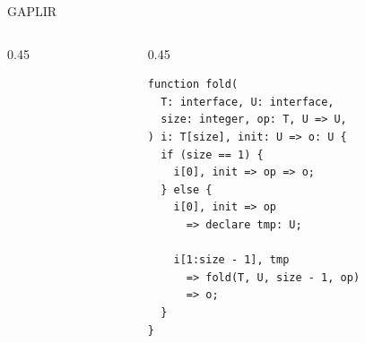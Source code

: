 \begin{frame}[fragile,t]{GAPLIR}
\begin{columns}[T]
\begin{column}{0.45\textwidth}
        \end{column}
        \begin{column}{0.45\textwidth}
\begin{lstlisting}[language=gapl]
function fold(
  T: interface, U: interface,
  size: integer, op: T, U => U,
) i: T[size], init: U => o: U {
  if (size == 1) {
    i[0], init => op => o;
  } else {
    i[0], init => op
      => declare tmp: U;

    i[1:size - 1], tmp
      => fold(T, U, size - 1, op)
      => o;
  }
}
\end{lstlisting}
        \end{column}
    \end{columns}
\end{frame}